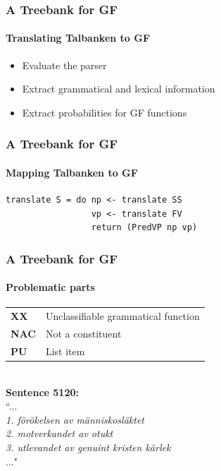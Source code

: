 \documentclass[10pt]{beamer}
\begin{document}
\begin{frame}


\end{frame}



\begin{frame}
\frametitle{A Treebank for GF}
\framesubtitle{Translating Talbanken to GF} 
\begin{itemize}
\item{Evaluate the parser}
\pause
\item{Extract grammatical and lexical information}
\pause
\item{Extract probabilities for GF functions}
\end{itemize}
\end{frame}

\begin{frame}[containsverbatim]
\frametitle{A Treebank for GF}
\framesubtitle{Mapping Talbanken to GF} 
\begin{verbatim}
translate S = do np <- translate SS
                 vp <- translate FV
                 return (PredVP np vp)
\end{verbatim}
\end{frame}

\begin{frame}
\frametitle{A Treebank for GF}
\framesubtitle{Problematic parts} 
\begin{tabular}{ll}
\textbf{XX} &Unclassifiable grammatical function\\
\textbf{NAC}&Not a constituent\\
\textbf{PU}&List item\\
\end{tabular}\\
\vspace{5mm}
\textbf{Sentence 5120:}\\
``...\\
\emph{1. förökelsen av människosläktet}\\
\emph{2. motverkandet av otukt}\\
\emph{3. utlevandet av genuint kristen kärlek}\\
..."\\

\end{frame}
\end{document}
